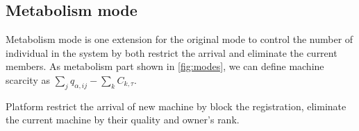 \subsection{Metabolism mode} %
\label{sub:metabolism mode}
Metabolism mode is one extension for the original mode to control the number of individual in the system by both restrict the arrival and eliminate the current members. As metabolism part shown in \autoref{fig:modes},
we can define machine scarcity as $\sum_jq_{\alpha,ij} - \sum_kC_{k,\tau}$.

Platform restrict the arrival of new machine by block the registration, eliminate the current machine by their quality and owner's rank.





